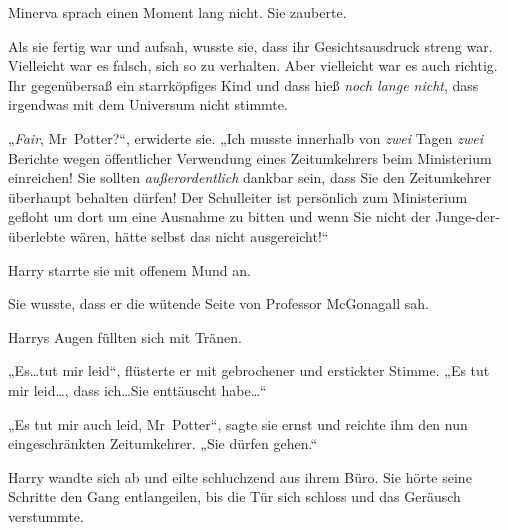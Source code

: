 Minerva sprach einen Moment lang nicht. Sie zauberte.

Als sie fertig war und aufsah, wusste sie, dass ihr Gesichtsausdruck streng war. Vielleicht war es falsch, sich so zu verhalten. Aber vielleicht war es auch richtig. Ihr gegenübersaß ein starrköpfiges Kind und dass hieß \emph{noch lange nicht}, dass irgendwas mit dem Universum nicht stimmte.

„\emph{Fair}, Mr~Potter?“, erwiderte sie. „Ich musste innerhalb von \emph{zwei} Tagen \emph{zwei} Berichte wegen öffentlicher Verwendung eines Zeitumkehrers beim Ministerium einreichen! Sie sollten \emph{außerordentlich} dankbar sein, dass Sie den Zeitumkehrer überhaupt behalten dürfen! Der Schulleiter ist persönlich zum Ministerium gefloht um dort um eine Ausnahme zu bitten und wenn Sie nicht der Junge-der-überlebte wären, hätte selbst das nicht ausgereicht!“

Harry starrte sie mit offenem Mund an.

Sie wusste, dass er die wütende Seite von Professor McGonagall sah.

Harrys Augen füllten sich mit Tränen.

„Es…tut mir leid“, flüsterte er mit gebrochener und erstickter Stimme. „Es tut mir leid…, dass ich…Sie enttäuscht habe…“

„Es tut mir auch leid, Mr~Potter“, sagte sie ernst und reichte ihm den nun eingeschränkten Zeitumkehrer. „Sie dürfen gehen.“

Harry wandte sich ab und eilte schluchzend aus ihrem Büro. Sie hörte seine Schritte den Gang entlangeilen, bis die Tür sich schloss und das Geräusch verstummte.

